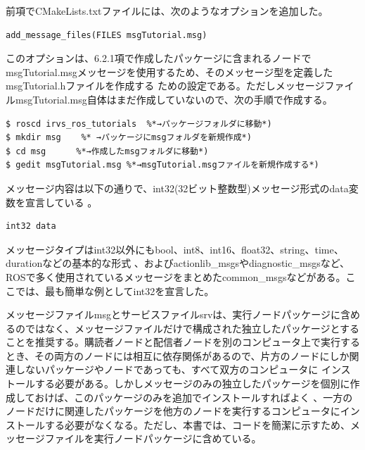 前項でCMakeLists.txtファイルには、次のようなオプションを追加した。

\begin{lstlisting}[language=make]
add_message_files(FILES msgTutorial.msg)
\end{lstlisting}

このオプションは、6.2.1項で作成したパッケージに含まれるノードでmsgTutorial.msgメッセージを使用するため、そのメッセージ型を定義したmsgTutorial.hファイルを作成する ための設定である。ただしメッセージファイルmsgTutorial.msg自体はまだ作成していないので、次の手順で作成する。

\begin{lstlisting}[language=ROS]
$ roscd irvs_ros_tutorials  %*→パッケージフォルダに移動*)
$ mkdir msg    %* →パッケージにmsgフォルダを新規作成*)
$ cd msg      %*→作成したmsgフォルダに移動*)
$ gedit msgTutorial.msg %*→msgTutorial.msgファイルを新規作成する*)
\end{lstlisting}

メッセージ内容は以下の通りで、int32(32ビット整数型)メッセージ形式のdata変数を宣言している  。

\begin{lstlisting}[language=ROS]
int32 data
\end{lstlisting}

メッセージタイプはint32以外にもbool、int8、int16、float32、string、time、durationなどの基本的な形式   、およびactionlib\_msgsやdiagnostic\_msgsなど、ROSで多く使用されているメッセージをまとめたcommon\_msgsなどがある。ここでは、最も簡単な例としてint32を宣言した。

\begin{exercise}
メッセージファイルmsgとサービスファイルsrvは、実行ノードパッケージに含めるのではなく、メッセージファイルだけで構成された独立したパッケージとすることを推奨する。購読者ノードと配信者ノードを別のコンピュータ上で実行するとき、その両方のノードには相互に依存関係があるので、片方のノードにしか関連しないパッケージやノードであっても、すべて双方のコンピュータに  インストールする必要がある。しかしメッセージのみの独立したパッケージを個別に作成しておけば、このパッケージのみを追加でインストールすればよく    、一方のノードだけに関連したパッケージを他方のノードを実行するコンピュータにインストールする必要がなくなる。ただし、本書では、コードを簡潔に示すため、メッセージファイルを実行ノードパッケージに含めている。
\end{exercise}

